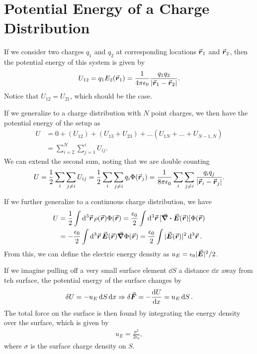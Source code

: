 \section{Potential Energy of a Charge Distribution}

If we consider two charges $q_1$ and $q_2$ at corresponding locations $\va*{r}_{1}$ and $\va*{r}_{2}$, then the potential energy of this system is given by
\begin{eqnarray}
    U_{12} = q_{1} E_{2}(\va*{r}_{1}) = \frac{1}{4 \pi \epsilon_0} \frac{q_1 q_2}{|\va*{r}_{1} - \va*{r}_{2}|}
.\end{eqnarray}
Notice that $U_{12} = U_{21}$, which should be the case.

If we generalize to a charge distribution with $N$ point charges, we then have the potential energy of the setup as 
\begin{align}
    U &= 0 + (U_{12}) + (U_{13} + U_{23}) + \ldots (U_{1N} + \ldots + U_{N-1,N}) \nonumber \\
               &= \sum_{i=2}^{N} \sum_{j = 1}^{i} U_{ij} 
.\end{align}
We can extend the second sum, noting that we are double counting
\begin{eqnarray}
    U = \frac{1}{2} \sum_{i} \sum_{j \ne i} U_{ij} = \frac{1}{2} \sum_{i} \sum_{j \ne i} q_{i} \Phi(\va*{r}_{j}) = \frac{1}{8 \pi \epsilon_0} \sum_{i} \sum_{j \ne i} \frac{q_{i} q_{j}}{|\va*{r}_{i} - \va*{r}_{j}|}
.\end{eqnarray}

If we further generalize to a continuous charge distribution, we have
\begin{align}
    U &= \frac{1}{2} \int \dd[3]{\va*{r}} \rho(\va*{r}) \Phi(\va*{r}) = \frac{\epsilon_0}{2} \int \dd[3]{\va*{r}} [\div{\va*{E}(\va*{r})}] \Phi(\va*{r}) \\
      &= - \frac{\epsilon_0}{2} \int \dd[3]{\va*{r}} \va*{E}(\va*{r}) \grad \Phi(\va*{r}) = \frac{\epsilon_0}{2} \int |\va*{E}(\va*{r})|^2 \dd[3]{\va*{r}}
.\end{align}
From this, we can define the electric energy density as $u_{E} = \epsilon_0 |\va*{E}|^2/2$.

If we imagine pulling off a very small surface element $\dd{S}$ a distance $\dd{x}$ away from teh surface, the potential energy of the surface changes by 
\begin{eqnarray}
    \delta{U} = -u_{E} \dd{S} \dd{x} \Rightarrow \delta\va*{F} = -\dv{U}{x} = u_{E} \dd{S}
.\end{eqnarray}
The total force on the surface is then found by integrating the energy density over the surface, which is given by
\begin{eqnarray}
    u_{E} = \frac{\sigma^2}{2 \epsilon_0}
,\end{eqnarray}
where $\sigma$ is the surface charge density on $S$.




